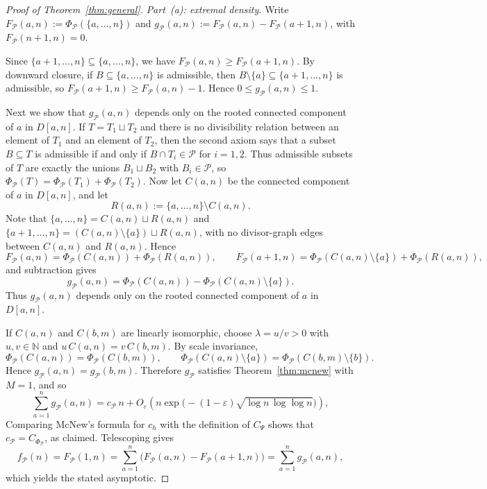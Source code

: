 \documentclass[11pt]{amsart}
\newcommand{\N}{\mathbb{N}}
\begin{document}
\begin{proof}[Proof of Theorem~\ref{thm:general}]
\noindent\textit{Part~\textup{(a)}: extremal density.}
Write \(F_{\mathcal{P}}(a,n):=\Phi_{\mathcal{P}}(\{a,\dots,n\})\) and \(g_{\mathcal{P}}(a,n):=F_{\mathcal{P}}(a,n)-F_{\mathcal{P}}(a+1,n)\), with \(F_{\mathcal{P}}(n+1,n)=0\).

Since \(\{a+1,\dots,n\}\subseteq \{a,\dots,n\}\), we have \(F_{\mathcal{P}}(a,n)\ge F_{\mathcal{P}}(a+1,n)\). By downward closure, if \(B\subseteq \{a,\dots,n\}\) is admissible, then \(B\setminus\{a\}\subseteq \{a+1,\dots,n\}\) is admissible, so \(F_{\mathcal{P}}(a+1,n)\ge F_{\mathcal{P}}(a,n)-1\).
Hence \(0\le g_{\mathcal{P}}(a,n)\le 1\).

Next we show that \(g_{\mathcal{P}}(a,n)\) depends only on the rooted connected component of \(a\) in \(D[a,n]\). If \(T=T_1\sqcup T_2\) and there is no divisibility relation between an element of \(T_1\) and an element of \(T_2\), then the second axiom says that a subset \(B\subseteq T\) is admissible if and only if \(B\cap T_i\in \mathcal{P}\) for \(i=1,2\). Thus admissible subsets of \(T\) are exactly the unions \(B_1\sqcup B_2\) with \(B_i\in \mathcal{P}\), so \(\Phi_{\mathcal{P}}(T)=\Phi_{\mathcal{P}}(T_1)+\Phi_{\mathcal{P}}(T_2)\).
Now let \(C(a,n)\) be the connected component of \(a\) in \(D[a,n]\), and let
\[
R(a,n):=\{a,\dots,n\}\setminus C(a,n).
\]
Note that \(\{a,\dots,n\}=C(a,n)\sqcup R(a,n)\) and \(\{a+1,\dots,n\}=(C(a,n)\setminus\{a\})\sqcup R(a,n)\), with no divisor-graph edges between \(C(a,n)\) and \(R(a,n)\). Hence
\[
F_{\mathcal{P}}(a,n)=\Phi_{\mathcal{P}}(C(a,n))+\Phi_{\mathcal{P}}(R(a,n)),
\qquad
F_{\mathcal{P}}(a+1,n)=\Phi_{\mathcal{P}}(C(a,n)\setminus\{a\})+\Phi_{\mathcal{P}}(R(a,n)),
\]
and subtraction gives
\[
g_{\mathcal{P}}(a,n)
=
\Phi_{\mathcal{P}}(C(a,n))
-
\Phi_{\mathcal{P}}(C(a,n)\setminus\{a\}).
\]
Thus \(g_{\mathcal{P}}(a,n)\) depends only on the rooted connected component of \(a\) in \(D[a,n]\).

If \(C(a,n)\) and \(C(b,m)\) are linearly isomorphic, choose \(\lambda=u/v>0\) with \(u,v\in \N\) and \(u\,C(a,n)=v\,C(b,m)\). By scale invariance,
\[
\Phi_{\mathcal{P}}(C(a,n))
=
\Phi_{\mathcal{P}}(C(b,m)),
\qquad
\Phi_{\mathcal{P}}(C(a,n)\setminus\{a\})
=
\Phi_{\mathcal{P}}(C(b,m)\setminus\{b\}).
\]
Hence \(g_{\mathcal{P}}(a,n)=g_{\mathcal{P}}(b,m)\). Therefore \(g_{\mathcal{P}}\) satisfies Theorem~\ref{thm:mcnew} with \(M=1\), and so
\[
\sum_{a=1}^{n} g_{\mathcal{P}}(a,n)
=
c_{\mathcal{P}}\,n
+
O_{\varepsilon}\!\left(
n\exp\!\bigl(-(1-\varepsilon)\sqrt{\log n\,\log\log n}\bigr)
\right),
\]
Comparing McNew's formula for \(c_h\) with the definition of \(C_\Psi\) shows that \(c_{\mathcal{P}}=C_{\Phi_{\mathcal{P}}}\), as claimed. Telescoping gives
\[
f_{\mathcal{P}}(n)
=
F_{\mathcal{P}}(1,n)
=
\sum_{a=1}^{n}\bigl(F_{\mathcal{P}}(a,n)-F_{\mathcal{P}}(a+1,n)\bigr)
=
\sum_{a=1}^{n} g_{\mathcal{P}}(a,n),
\]
which yields the stated asymptotic.


\end{proof}
\end{document}
